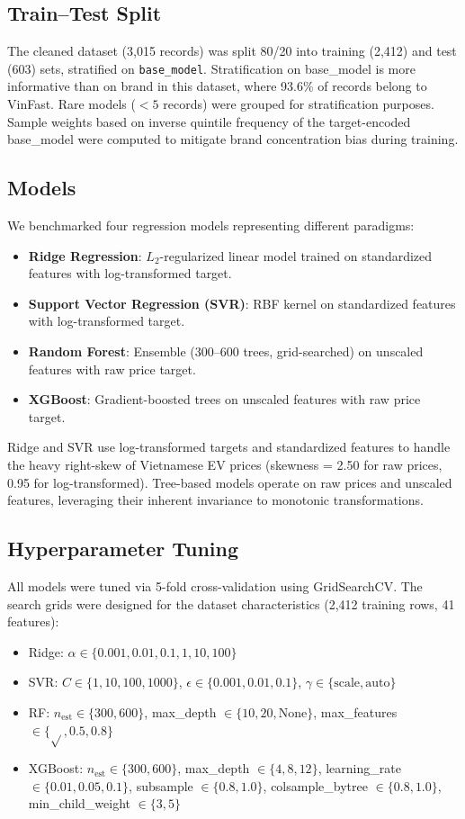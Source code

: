 \documentclass[lettersize,journal]{IEEEtran}
\begin{document}
\subsection{Train--Test Split}
The cleaned dataset (3,015 records) was split 80/20 into training (2,412)
and test (603) sets, stratified on \texttt{base\_model}. Stratification on
base\_model is more informative than on brand in this dataset, where 93.6\%
of records belong to VinFast. Rare models ($< 5$ records) were grouped for
stratification purposes. Sample weights based on inverse quintile frequency
of the target-encoded base\_model were computed to mitigate brand
concentration bias during training.

\subsection{Models}
We benchmarked four regression models representing different paradigms:
\begin{itemize}
    \item \textbf{Ridge Regression}: $L_2$-regularized linear model trained
    on standardized features with log-transformed target.
    \item \textbf{Support Vector Regression (SVR)}: RBF kernel on
    standardized features with log-transformed target.
    \item \textbf{Random Forest}: Ensemble (300--600 trees, grid-searched)
    on unscaled features with raw price target.
    \item \textbf{XGBoost}: Gradient-boosted trees on unscaled features with
    raw price target.
\end{itemize}

Ridge and SVR use log-transformed targets and standardized features to
handle the heavy right-skew of Vietnamese EV prices (skewness = 2.50 for
raw prices, 0.95 for log-transformed). Tree-based models operate on raw
prices and unscaled features, leveraging their inherent invariance to
monotonic transformations.

\subsection{Hyperparameter Tuning}
All models were tuned via 5-fold cross-validation using GridSearchCV. The
search grids were designed for the dataset characteristics (2,412 training
rows, 41 features):
\begin{itemize}
    \item Ridge: $\alpha \in \{0.001, 0.01, 0.1, 1, 10, 100\}$
    \item SVR: $C \in \{1, 10, 100, 1000\}$, $\epsilon \in \{0.001, 0.01, 0.1\}$,
    $\gamma \in \{\text{scale}, \text{auto}\}$
    \item RF: $n_{\text{est}} \in \{300, 600\}$, max\_depth $\in \{10, 20, \text{None}\}$,
    max\_features $\in \{\sqrt{}, 0.5, 0.8\}$
    \item XGBoost: $n_{\text{est}} \in \{300, 600\}$, max\_depth $\in \{4, 8, 12\}$,
    learning\_rate $\in \{0.01, 0.05, 0.1\}$, subsample $\in \{0.8, 1.0\}$,
    colsample\_bytree $\in \{0.8, 1.0\}$, min\_child\_weight $\in \{3, 5\}$
\end{itemize}
\end{document}
